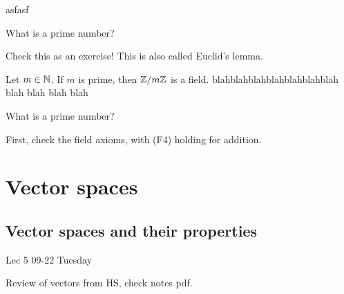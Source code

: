 \documentclass[12pt]{article}
\newcommand{\lecdate}[1]{ %
    \vspace{0in}
    \begin{flushright}
        #1
    \end{flushright}
    \vspace{0in}
}
\begin{document}
asfasf
\begin{remark}
    What is a prime number?
\end{remark}

Check this as an exercise! This is also called Euclid's lemma.

\begin{thm}
    Let $m \in \mathbb{N}$. If $m$ is prime, then $\mathbb{Z} / m \mathbb{Z}$ is a field. blahblahblahblahblahblahblah blah blah blah blah
\end{thm}
\begin{remark}
    What is a prime number?
\end{remark}
\begin{pf}
    First, check the field axioms, with (F4) holding for addition.
\end{pf}

\section{Vector spaces}
\subsection{Vector spaces and their properties}
\lecdate{Lec 5 09-22 Tuesday}

Review of vectors from HS, check notes pdf.
\end{document}
